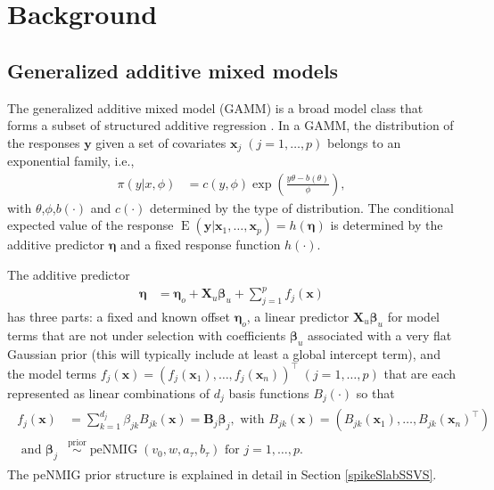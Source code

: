 \documentclass[article, shortnames, nojss, noheadings, notitle]{jss}
\newcommand{\priorsim}{\stackrel{\text{prior}}{\sim}}
\newcommand{\EW}{\operatorname{E}}
\begin{document}
\newpage

\section{Background}\label{background}
\subsection{Generalized additive mixed models}\label{gamm}

The generalized additive mixed model (GAMM) is a broad model class
that forms a subset of structured additive regression
\citep{Fahr:Kneib:Lang:2004}. In a GAMM, the distribution of the responses $\bm{y}$ given a set of covariates $\bm x_j\;
(j=1,\dots,p)$ belongs to an exponential family, i.e.,
\begin{align*}
    \pi(y |x, \phi) &= c(y, \phi)\exp\left(\frac{
    y \theta- b(\theta)}{\phi}\right),
\end{align*}
with $\theta$,$\phi$,$b(\cdot)$ and $c(\cdot)$ determined by the type of
distribution.
The conditional expected value of the response $\EW(\bm y | \bm x_1,\ldots, \bm x_p) = h(\bm \eta)$
is determined by the additive predictor $\bm \eta$ and a fixed response function $h(\cdot)$.

The additive predictor
\begin{align}\label{F:eta}
\bm\eta &= \bm\eta_o + \bm X_u \bm\beta_u + \sum^p_{j=1}f_j(\bm x)
\end{align}
has three parts: a fixed and known offset $\bm\eta_o$,
a linear predictor $\bm X_u \bm\beta_u$ for model terms that are not under selection with coefficients $\bm\beta_u$
associated with a very flat Gaussian prior (this will typically include at least a global intercept term), and the model terms
$f_j(\bm x)=\left(f_j(\bm x_{1}),\ldots,f_j(\bm x_{n})\right)^\top\;(j=1,\dots,p)$ that are each represented as linear combinations of $d_j$ basis functions $B_j(\cdot)$ so that
\begin{align}
\begin{split}
f_j(\bm x) &= \sum_{k=1}^{d_j} \beta_{jk}B_{jk}(\bm x)= \bm B_j \bm \beta_j,  \text{ with } B_{jk}(\bm x)=\left(B_{jk}(\bm x_{1}),\ldots,B_{jk}(\bm x_{n})^\top\right)\\
\text{ and }\bm\beta_j &\priorsim \operatorname{peNMIG}(v_0, w, a_\tau, b_\tau) \text{ for } j=1,\dots,p. \label{F:term}
\end{split}
\end{align}
The peNMIG prior structure is explained in detail in Section \ref{spikeSlabSSVS}.
\end{document}
